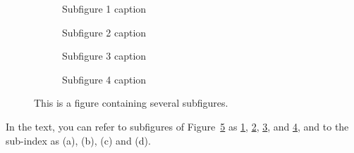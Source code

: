 \documentclass{article}
\begin{document}
\begin{figure}[h]
\centering
  \begin{subfigure}[b]{0.45\textwidth}
    \centering
    \fbox{\rule{0pt}{5cm}\rule{5cm}{0pt}}  %
    \caption{Subfigure 1 caption}
    \label{fig:sub1}
  \end{subfigure}
  \hfill
  \begin{subfigure}[b]{0.45\textwidth}
    \centering
    \fbox{\rule{0pt}{5cm}\rule{5cm}{0pt}}
    \caption{Subfigure 2 caption}
    \label{fig:sub2}
  \end{subfigure}

  \vspace{1em}

  \begin{subfigure}[b]{0.45\textwidth}
    \centering
    \fbox{\rule{0pt}{5cm}\rule{5cm}{0pt}}
    \caption{Subfigure 3 caption}
    \label{fig:sub3}
  \end{subfigure}
  \hfill
  \begin{subfigure}[b]{0.45\textwidth}
    \centering
    \fbox{\rule{0pt}{5cm}\rule{5cm}{0pt}}
    \caption{Subfigure 4 caption}
    \label{fig:sub4}
  \end{subfigure}

\caption{This is a figure containing several subfigures.}
\label{fig:subfigs}
\end{figure}

In the text, you can refer to subfigures of Figure~\ref{fig:subfigs}
as \ref{fig:sub1}, \ref{fig:sub2}, \ref{fig:sub3}, and \ref{fig:sub4},
and to the sub-index as (a), (b), (c) and (d).
\end{document}
